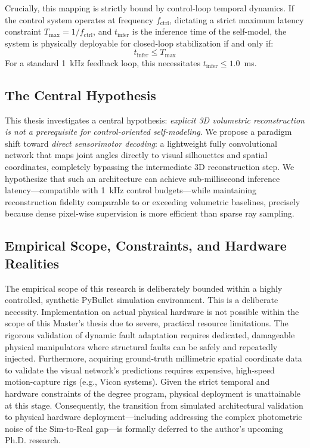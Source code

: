 \documentclass[12pt,a4paper,oneside]{report}
\begin{document}
Crucially, this mapping is strictly bound by control-loop temporal dynamics. If the control system operates at frequency $f_{\text{ctrl}}$, dictating a strict maximum latency constraint $T_{\text{max}} = 1/f_{\text{ctrl}}$, and $t_{\text{infer}}$ is the inference time of the self-model, the system is physically deployable for closed-loop stabilization if and only if:
\begin{equation}
t_{\text{infer}} \le T_{\text{max}}
\end{equation}
For a standard 1~kHz feedback loop, this necessitates $t_{\text{infer}} \le 1.0$~ms.

\subsection{The Central Hypothesis}
\label{subsec:central_hypothesis_intro}

This thesis investigates a central hypothesis: \textit{explicit 3D volumetric reconstruction is not a prerequisite for control-oriented self-modeling}. We propose a paradigm shift toward \textit{direct sensorimotor decoding}: a lightweight fully convolutional network that maps joint angles directly to visual silhouettes and spatial coordinates, completely bypassing the intermediate 3D reconstruction step. We hypothesize that such an architecture can achieve sub-millisecond inference latency---compatible with 1~kHz control budgets---while maintaining reconstruction fidelity comparable to or exceeding volumetric baselines, precisely because dense pixel-wise supervision is more efficient than sparse ray sampling.

\subsection{Empirical Scope, Constraints, and Hardware Realities}
\label{subsec:empirical_scope_intro}

The empirical scope of this research is deliberately bounded within a highly controlled, synthetic PyBullet simulation environment. This is a deliberate necessity. Implementation on actual physical hardware is not possible within the scope of this Master's thesis due to severe, practical resource limitations. The rigorous validation of dynamic fault adaptation requires dedicated, damageable physical manipulators where structural faults can be safely and repeatedly injected. Furthermore, acquiring ground-truth millimetric spatial coordinate data to validate the visual network's predictions requires expensive, high-speed motion-capture rigs (e.g., Vicon systems). Given the strict temporal and hardware constraints of the degree program, physical deployment is unattainable at this stage. Consequently, the transition from simulated architectural validation to physical hardware deployment---including addressing the complex photometric noise of the Sim-to-Real gap---is formally deferred to the author's upcoming Ph.D. research.
\end{document}
